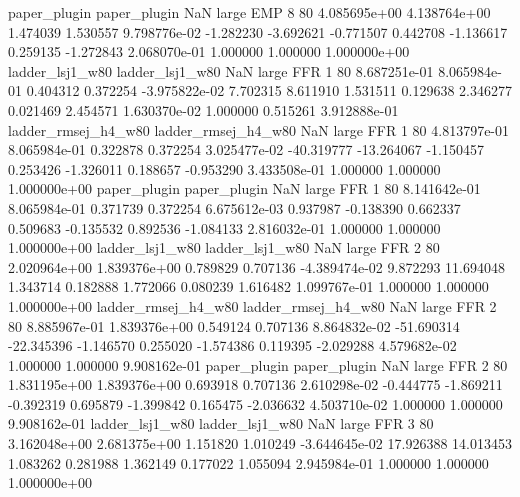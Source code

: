        paper_plugin        paper_plugin                   NaN      large      EMP                 8 80 4.085695e+00   4.138764e+00      1.474039       1.530557  9.798776e-02     -1.282230     -3.692621    -0.771507       0.442708 -1.136617   0.259135    -1.272843   2.068070e-01            1.000000        1.000000        1.000000e+00
    ladder_lsj1_w80     ladder_lsj1_w80                   NaN      large      FFR                 1 80 8.687251e-01   8.065984e-01      0.404312       0.372254 -3.975822e-02      7.702315      8.611910     1.531511       0.129638  2.346277   0.021469     2.454571   1.630370e-02            1.000000        0.515261        3.912888e-01
ladder_rmsej_h4_w80 ladder_rmsej_h4_w80                   NaN      large      FFR                 1 80 4.813797e-01   8.065984e-01      0.322878       0.372254  3.025477e-02    -40.319777    -13.264067    -1.150457       0.253426 -1.326011   0.188657    -0.953290   3.433508e-01            1.000000        1.000000        1.000000e+00
       paper_plugin        paper_plugin                   NaN      large      FFR                 1 80 8.141642e-01   8.065984e-01      0.371739       0.372254  6.675612e-03      0.937987     -0.138390     0.662337       0.509683 -0.135532   0.892536    -1.084133   2.816032e-01            1.000000        1.000000        1.000000e+00
    ladder_lsj1_w80     ladder_lsj1_w80                   NaN      large      FFR                 2 80 2.020964e+00   1.839376e+00      0.789829       0.707136 -4.389474e-02      9.872293     11.694048     1.343714       0.182888  1.772066   0.080239     1.616482   1.099767e-01            1.000000        1.000000        1.000000e+00
ladder_rmsej_h4_w80 ladder_rmsej_h4_w80                   NaN      large      FFR                 2 80 8.885967e-01   1.839376e+00      0.549124       0.707136  8.864832e-02    -51.690314    -22.345396    -1.146570       0.255020 -1.574386   0.119395    -2.029288   4.579682e-02            1.000000        1.000000        9.908162e-01
       paper_plugin        paper_plugin                   NaN      large      FFR                 2 80 1.831195e+00   1.839376e+00      0.693918       0.707136  2.610298e-02     -0.444775     -1.869211    -0.392319       0.695879 -1.399842   0.165475    -2.036632   4.503710e-02            1.000000        1.000000        9.908162e-01
    ladder_lsj1_w80     ladder_lsj1_w80                   NaN      large      FFR                 3 80 3.162048e+00   2.681375e+00      1.151820       1.010249 -3.644645e-02     17.926388     14.013453     1.083262       0.281988  1.362149   0.177022     1.055094   2.945984e-01            1.000000        1.000000        1.000000e+00
